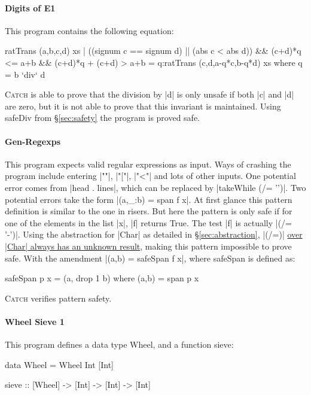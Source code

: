 \documentclass[preprint]{sigplanconf}
\newcommand{\C}[1]{\textsf{#1}}
\newcommand{\catch}{\textsc{Catch}}
\begin{document}
\paragraph{Digits of E1}

This program contains the following equation:

\begin{code}
ratTrans (a,b,c,d) xs |
  ((signum c == signum d) || (abs c < abs d)) &&
  (c+d)*q <= a+b && (c+d)*q + (c+d) > a+b
     = q:ratTrans (c,d,a-q*c,b-q*d) xs
  where q = b `div` d
\end{code}

\noindent \catch{} is able to prove that the division by |d| is only unsafe if both |c| and |d| are zero, but it is not able to prove that this invariant is maintained. Using \C{safeDiv} from \S\ref{sec:safety} the program is proved safe.

\paragraph{Gen-Regexps}

This program expects valid regular expressions as input. Ways of crashing the program include entering |""|, |"["|, |"<"| and lots of other inputs. One potential error comes from |head . lines|, which can be replaced by |takeWhile (/= '\n')|. Two potential errors take the form |(a,_:b) = span f x|. At first glance this pattern definition is similar to the one in \C{risers}. But here the pattern is only safe if for one of the elements in the list |x|, |f| returns True. The test |f| is actually |(/= '-')|. Using the abstraction for |Char| as detailed in \S\ref{sec:abstraction}, |(/=)| \underline{over |Char| always has an unknown result}, making this pattern impossible to prove safe. With the amendment  |(a,b) = safeSpan f x|, where \C{safeSpan} is defined as:

\begin{code}
safeSpan p x = (a, drop 1 b) where (a,b) = span p x
\end{code}

\noindent \catch{} verifies pattern safety.

\paragraph{Wheel Sieve 1}

This program defines a data type \C{Wheel}, and a function \C{sieve}:

\begin{code}
data Wheel = Wheel Int [Int]

sieve :: [Wheel] -> [Int] -> [Int] -> [Int]
\end{code}
\end{document}
